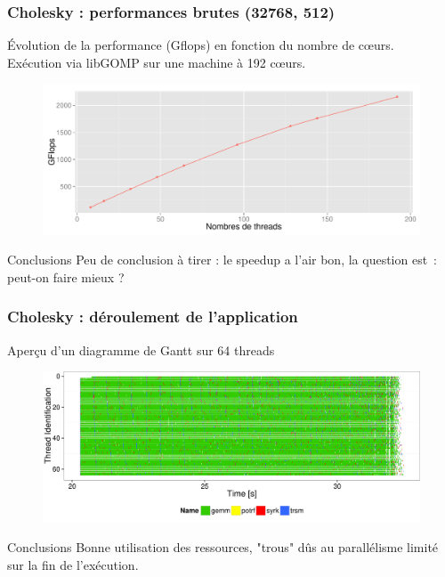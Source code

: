 \documentclass[xcolor={usenames,dvipsnames,svgnames,table}, aspectratio=43]{beamer}
\begin{document}
\begin{frame}
  \frametitle{Cholesky : performances brutes (32768, 512)}

  Évolution de la performance (Gflops) en fonction du nombre de cœurs.\\
  Exécution via libGOMP sur une machine à 192 cœurs.

\begin{figure}
  \includegraphics[width=\textwidth]{graph/graph_evolution_cholesky_32768_512.pdf}
\end{figure}
 {
  \begin{block}{Conclusions}
    Peu de conclusion à tirer : le speedup a l'air bon, la question est~: peut-on faire mieux ?
  \end{block}
}

\end{frame}

\begin{frame}
\frametitle{Cholesky : déroulement de l'application}

Aperçu d'un diagramme de Gantt sur 64 threads
\begin{figure}
  \includegraphics[width=\textwidth]{graph/gantt_32768_512.pdf}
\end{figure}
 {
  \begin{block}{Conclusions}
    Bonne utilisation des ressources, "trous" dûs au parallélisme limité sur la fin de l'exécution.
  \end{block}
}

\end{frame}
\end{document}
